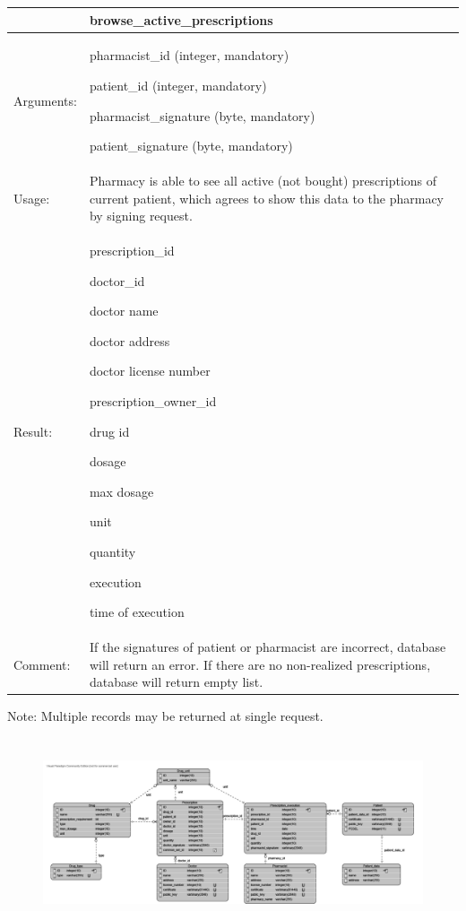 
    \begin{longtable}{| p{3cm} | p{10.75cm} |}
    \hline
     & browse\_active\_prescriptions \\ \hline
    Arguments: &  \begin{packed_enum}
    	\item pharmacist\_id (integer, mandatory)
		\item patient\_id (integer, mandatory)
		\item pharmacist\_signature (byte, mandatory)
		\item patient\_signature (byte, mandatory)
	\end{packed_enum}     \\ \hline
    Usage: & Pharmacy is able to see all active (not bought) prescriptions of current patient, which agrees to show this data to the pharmacy by signing request. \\ \hline
    Result: & \begin{packed_enum}
    	\item prescription\_id
    	\item doctor\_id
    	\item doctor name
    	\item doctor address
    	\item doctor license number
    	\item prescription\_owner\_id
    	\item drug id
    	\item dosage
    	\item max dosage
    	\item unit
    	\item quantity
    	\item execution
    	\item time of execution
	\end{packed_enum}     \\ \hline	
		Comment: & If the signatures of patient or pharmacist are incorrect, database will return an error. If there are no non-realized prescriptions, database will return empty list.\\ \hline
    \end{longtable}
Note: Multiple records may be returned at single request.
\normalsize
\newpage
\section{}

\begin{figure}[h]
\begin{center}
\includegraphics[width=1\textwidth , angle=90]{database/databaseSchema.png}
\end{center}
\end{figure} 
